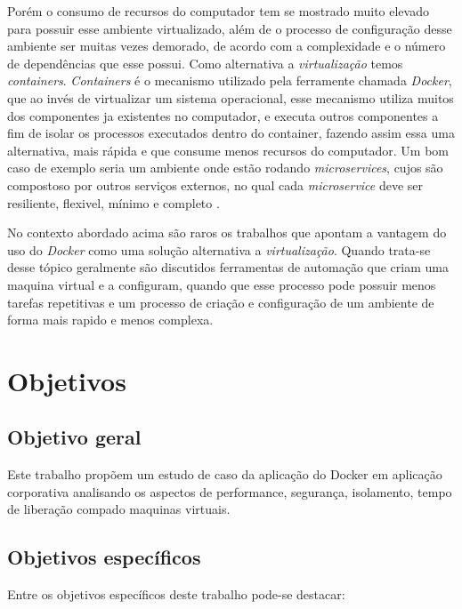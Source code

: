 \documentclass[11pt,a4paper]{article}
\begin{document}
Porém o consumo de recursos do computador tem se mostrado muito elevado para possuir esse ambiente virtualizado,
além de o processo de configuração desse ambiente ser muitas vezes demorado, de acordo com a complexidade e
o número de dependências que esse possui. Como alternativa a \textit{virtualização} temos \textit{containers}.
\textit{Containers} é o mecanismo utilizado pela ferramente chamada \textit{Docker}, que ao invés de virtualizar
um sistema operacional, esse mecanismo utiliza muitos dos componentes ja existentes no computador, e executa
outros componentes a fim de isolar os processos executados dentro do container\cite{TW_docker_for_builds},
fazendo assim essa uma alternativa, mais rápida e que consume menos recursos do computador\cite{DZone_CD_guide_v3}.
Um bom caso de exemplo seria um ambiente onde estão rodando \textit{microservices}, cujos são compostoso por
outros serviços externos, no qual cada \textit{microservice} deve ser resiliente, flexivel, mínimo e completo
\cite{Bugwadia_arch_constrains}.

No contexto abordado acima são raros os trabalhos que apontam a vantagem do uso do \textit{Docker} como uma solução
alternativa a \textit{virtualização}\cite{Jafari_infra_as_a_code}. Quando trata-se desse tópico geralmente são
discutidos ferramentas de automação que criam uma maquina virtual e a configuram, quando que esse processo
pode possuir menos tarefas repetitivas e um processo de criação e configuração de um ambiente de forma mais rapido e menos complexa.

\section{Objetivos}\label{sec:objetivos}

\subsection{Objetivo geral}

Este trabalho propõem um estudo de caso da aplicação do Docker em aplicação corporativa analisando os aspectos
de performance, segurança, isolamento, tempo de liberação compado maquinas virtuais.

\subsection{Objetivos específicos}

Entre os objetivos específicos deste trabalho pode-se destacar:
\end{document}
